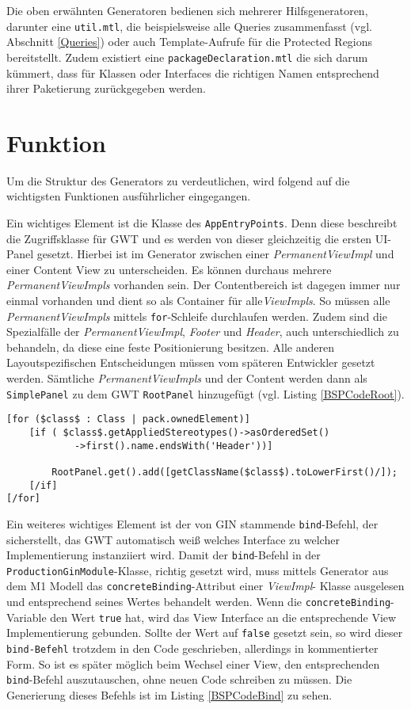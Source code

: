 Die oben erwähnten Generatoren bedienen sich mehrerer Hilfsgeneratoren, darunter eine \texttt{util.mtl}, die beispielsweise alle Queries zusammenfasst (vgl. Abschnitt \ref{Queries}) oder auch Template-Aufrufe für die Protected Regions bereitstellt. Zudem existiert eine \texttt{packageDeclaration.mtl} die sich darum kümmert, dass für Klassen oder Interfaces die richtigen Namen entsprechend ihrer Paketierung zurückgegeben werden. 

\section{Funktion}\label{Funktion}
Um die Struktur des Generators zu verdeutlichen, wird folgend auf die wichtigsten Funktionen ausführlicher eingegangen.

Ein wichtiges Element ist die Klasse des \texttt{AppEntryPoints}. Denn diese beschreibt die Zugriffsklasse für GWT und es werden von dieser gleichzeitig die ersten UI-Panel gesetzt. Hierbei ist im Generator zwischen einer \textit{PermanentViewImpl} und einer Content View zu unterscheiden. Es können durchaus mehrere \textit{PermanentViewImpls} vorhanden sein. Der Contentbereich ist dagegen immer nur einmal vorhanden und dient so als Container für alle\textit{ViewImpls}. So müssen alle \textit{PermanentViewImpls} mittels \texttt{for}-Schleife durchlaufen werden. Zudem sind die Spezialfälle der \textit{PermanentViewImpl}, \textit{Footer} und \textit{Header}, auch unterschiedlich zu behandeln, da diese eine feste Positionierung besitzen. Alle anderen Layoutspezifischen Entscheidungen müssen vom späteren Entwickler gesetzt werden. Sämtliche \textit{PermanentViewImpls} und der Content werden dann als \texttt{SimplePanel} zu dem GWT \texttt{RootPanel} hinzugefügt (vgl. Listing \ref{BSPCodeRoot}). 
\lstset{language=mtl}
\begin{lstlisting}[caption={Hinzufügen eines Panels zum \texttt{RootPane}l, am Beipsiel eines \textit{Header}s}, label={BSPCodeRoot}]
[for ($class$ : Class | pack.ownedElement)]
	[if ( $class$.getAppliedStereotypes()->asOrderedSet()
			->first().name.endsWith('Header'))]

		RootPanel.get().add([getClassName($class$).toLowerFirst()/]);
	[/if]
[/for]
\end{lstlisting}
Ein weiteres wichtiges Element ist der von GIN stammende \texttt{bind}-Befehl, der sicherstellt, das GWT automatisch weiß welches Interface zu welcher Implementierung instanziiert wird.
Damit der \texttt{bind}-Befehl in der \texttt{ProductionGinModule}-Klasse, richtig gesetzt wird, muss mittels Generator aus dem M1 Modell das \texttt{concreteBinding}-Attribut einer \textit{ViewImpl}- Klasse ausgelesen und entsprechend seines Wertes behandelt werden. Wenn die \texttt{concreteBinding}-Variable den Wert \texttt{true} hat, wird das View Interface an die entsprechende View Implementierung gebunden. Sollte der Wert auf \texttt{false} gesetzt sein, so wird dieser \texttt{bind-Befehl} trotzdem in den Code geschrieben, allerdings in kommentierter Form. So ist es später möglich beim Wechsel einer View, den entsprechenden \texttt{bind}-Befehl auszutauschen, ohne neuen Code schreiben zu müssen. Die Generierung dieses Befehls ist im Listing \ref{BSPCodeBind} zu sehen.
